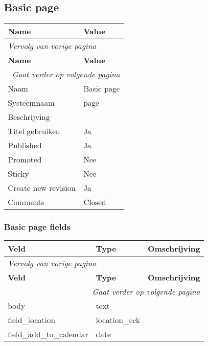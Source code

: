\subsection{Basic page}
\label{sec:content-basic page}
  \begin{longtable}{| p{7.50cm}|p{7.50cm}|}
  \hline
  \rowcolor{tableheader}
  \textbf{Name} & \textbf{Value}  \tabularnewline
  \hline
\endfirsthead
\multicolumn{2}{l}{\textit{Vervolg van vorige pagina}} \\
\hline
\rowcolor{tableheader}
  \textbf{Name} & \textbf{Value}  \tabularnewline
  \hline
\hline
\endhead
\multicolumn{2}{r}{\textit{Gaat verder op volgende pagina}} \\
\endfoot
\hline
\endlastfoot
  Naam & Basic page  \tabularnewline
  \hline
  Systeemnaam & page  \tabularnewline
  \hline
  Beschrijving &   \tabularnewline
  \hline
  Titel gebruiken & Ja  \tabularnewline
  \hline
  Published & Ja  \tabularnewline
  \hline
  Promoted & Nee  \tabularnewline
  \hline
  Sticky & Nee  \tabularnewline
  \hline
  Create new revision & Ja  \tabularnewline
  \hline
  Comments & Closed  \tabularnewline
  \hline
  \end{longtable}

\subsubsection{Basic page fields}
  \begin{longtable}{| p{5.00cm}|p{5.00cm}|p{5.00cm}|}
  \hline
  \rowcolor{tableheader}
  \textbf{Veld} & \textbf{Type} & \textbf{Omschrijving}  \tabularnewline
  \hline
\endfirsthead
\multicolumn{3}{l}{\textit{Vervolg van vorige pagina}} \\
\hline
\rowcolor{tableheader}
  \textbf{Veld} & \textbf{Type} & \textbf{Omschrijving}  \tabularnewline
  \hline
\hline
\endhead
\multicolumn{3}{r}{\textit{Gaat verder op volgende pagina}} \\
\endfoot
\hline
\endlastfoot
  body & text &   \tabularnewline
  \hline
  field\_location & location\_cck &   \tabularnewline
  \hline
  field\_add\_to\_calendar & date &   \tabularnewline
  \hline
  \end{longtable}

